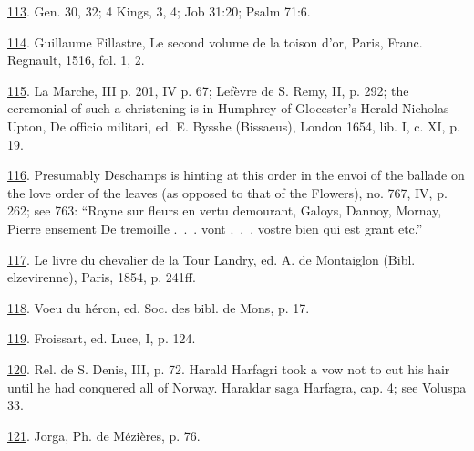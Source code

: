 \protect\hypertarget{23_NOTES.xhtmlux5cux23id_1710}{\protect\hyperlink{10_Chapter_Three__THE_HEROIC_DREAM.xhtmlux5cux23id_1709}{113}}.
Gen. 30, 32; 4 Kings, 3, 4; Job 31:20; Psalm 71:6.

\protect\hypertarget{23_NOTES.xhtmlux5cux23id_1708}{\protect\hyperlink{10_Chapter_Three__THE_HEROIC_DREAM.xhtmlux5cux23id_1707}{114}}.
Guillaume Fillastre, Le second volume de la toison d'or, Paris, Franc.
Regnault, 1516, fol. 1, 2.

\protect\hypertarget{23_NOTES.xhtmlux5cux23id_1706}{\protect\hyperlink{10_Chapter_Three__THE_HEROIC_DREAM.xhtmlux5cux23id_1705}{115}}.
La Marche, III p. 201, IV p. 67; Lefèvre de S. Remy, II, p. 292; the
ceremonial of such a christening is in Humphrey of Glocester's Herald
Nicholas Upton, De officio militari, ed. E. Bysshe (Bissaeus), London
1654, lib. I, c. XI, p. 19.

\protect\hypertarget{23_NOTES.xhtmlux5cux23id_1704}{\protect\hyperlink{10_Chapter_Three__THE_HEROIC_DREAM.xhtmlux5cux23id_1703}{116}}.
Presumably Deschamps is hinting at this order in the envoi of the
ballade on the love order of the leaves (as opposed to that of the
Flowers), no. 767, IV, p. 262; see 763: ``Royne sur fleurs en vertu
demourant, Galoys, Dannoy, Mornay, Pierre ensement De tremoille .~.~.
vont .~.~. vostre bien qui est grant etc.''

\protect\hypertarget{23_NOTES.xhtmlux5cux23id_1702}{\protect\hyperlink{10_Chapter_Three__THE_HEROIC_DREAM.xhtmlux5cux23id_1701}{117}}.
Le livre du chevalier de la Tour Landry, ed. A. de Montaiglon (Bibl.
elzevirenne), Paris, 1854, p. 241ff.

\protect\hypertarget{23_NOTES.xhtmlux5cux23id_1700}{\protect\hyperlink{10_Chapter_Three__THE_HEROIC_DREAM.xhtmlux5cux23id_1699}{118}}.
Voeu du héron, ed. Soc. des bibl. de Mons, p. 17.

\protect\hypertarget{23_NOTES.xhtmlux5cux23id_1698}{\protect\hyperlink{10_Chapter_Three__THE_HEROIC_DREAM.xhtmlux5cux23id_1697}{119}}.
Froissart, ed. Luce, I, p. 124.

\protect\hypertarget{23_NOTES.xhtmlux5cux23id_1696}{\protect\hyperlink{10_Chapter_Three__THE_HEROIC_DREAM.xhtmlux5cux23id_1695}{120}}.
Rel. de S. Denis, III, p. 72. Harald Harfagri took a vow not to cut his
\protect\hypertarget{23_NOTES.xhtmlux5cux23page_409}{}{}hair until he
had conquered all of Norway. Haraldar saga Harfagra, cap. 4; see Voluspa
33.

\protect\hypertarget{23_NOTES.xhtmlux5cux23id_1694}{\protect\hyperlink{10_Chapter_Three__THE_HEROIC_DREAM.xhtmlux5cux23id_1693}{121}}.
Jorga, Ph. de Mézières, p. 76.


